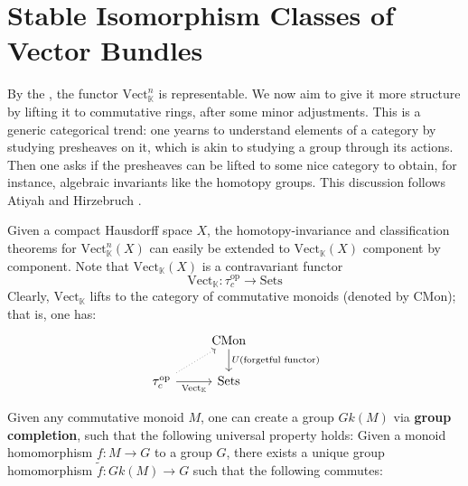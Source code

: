 \documentclass[11pt,a4paper]{article}
\begin{document}
\section*{Stable Isomorphism Classes of Vector Bundles}
By the , the functor $\text{Vect}_{\mathbb{K}}^n$ is representable. We now aim to give it more structure by lifting it to commutative rings, after some minor adjustments. This is a generic categorical trend: one yearns to understand elements of a category by studying presheaves on it, which is akin to studying a group through its actions. Then one asks if the presheaves can be lifted to some nice category to obtain, for instance, algebraic invariants like the homotopy groups. This discussion follows Atiyah and Hirzebruch \cite{atiyah1961vector}.

Given a compact Hausdorff space $X$, the homotopy-invariance and classification theorems for $\text{Vect}_{\mathbb K}^n(X)$ can easily be extended to $\text{Vect}_{\mathbb{K}}(X)$ component by component. Note that $\text{Vect}_{\mathbb{K}}(X)$ is a contravariant functor
$$\text{Vect}_{\mathbb{K}}: \tau_c^{\text{op}} \rightarrow \text{Sets}$$
Clearly, $\text{Vect}_{\mathbb{K}}$ lifts to the category of commutative monoids (denoted by CMon); that is, one has:
\[\begin{tikzcd}
	& {\text{CMon}} \\
	{\tau_c^{\text{op}}} & {\text{Sets}}
	\arrow["{\text{Vect}_{\mathbb{K}}}"', from=2-1, to=2-2]
	\arrow[dotted, from=2-1, to=1-2]
	\arrow["{U (\text{forgetful functor})}", from=1-2, to=2-2]
\end{tikzcd}\]

Given any commutative monoid $M$, one can create a group $Gk(M)$ via \textbf{group completion}, such that the following universal property holds: Given a monoid homomorphism $f:M\to G$ to a group $G$, there exists a unique group homomorphism $\widetilde{f}: Gk(M) \rightarrow G$ such that the following commutes:
\end{document}
